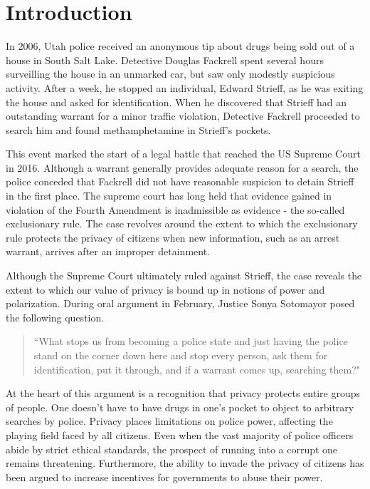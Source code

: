 %

\section{Introduction}
\label{sec:intro}




In 2006, Utah police received an anonymous tip about drugs being sold out of a house in South Salt Lake. Detective Douglas Fackrell spent several hours surveilling the house in an unmarked car, but saw only modestly suspicious activity.  After a week, he stopped an individual, Edward Strieff, as he was exiting the house and asked for identification.  When he discovered that Strieff had an outstanding warrant for a minor traffic violation, Detective Fackrell proceeded to search him and found methamphetamine in Strieff's pockets.  

This event marked the start of a legal battle that reached the US Supreme Court in 2016.  Although a warrant generally provides adequate reason for a search, the police conceded that Fackrell did not have reasonable suspicion to detain Strieff in the first place.  The supreme court has long held that evidence gained in violation of the Fourth Amendment is inadmissible as evidence - the so-called exclusionary rule.  The case revolves around the extent to which the exclusionary rule protects the privacy of citizens when new information, such as an arrest warrant, arrives after an improper detainment.

Although the Supreme Court ultimately ruled against Strieff, the case reveals the extent to which our value of privacy is bound up in notions of power and polarization.  During oral argument in February, Justice Sonya Sotomayor posed the following question. 

\begin{quote}``What stops us from becoming a police state and just having the police stand on the corner down here and stop every person, ask them for identification, put it through, and if a warrant comes up, searching them?"
\end{quote}

At the heart of this argument is a recognition that privacy protects entire groups of people.  One doesn't have to have drugs in one's pocket to object to arbitrary searches by police.  Privacy places limitations on police power, affecting the playing field faced by all citizens.  Even when the vast majority of police officers abide by strict ethical standards, the prospect of running into a corrupt one remains threatening.  Furthermore, the ability to invade the privacy of citizens has been argued to increase incentives for governments to abuse their power.~\cite{laskowskigovernment}

